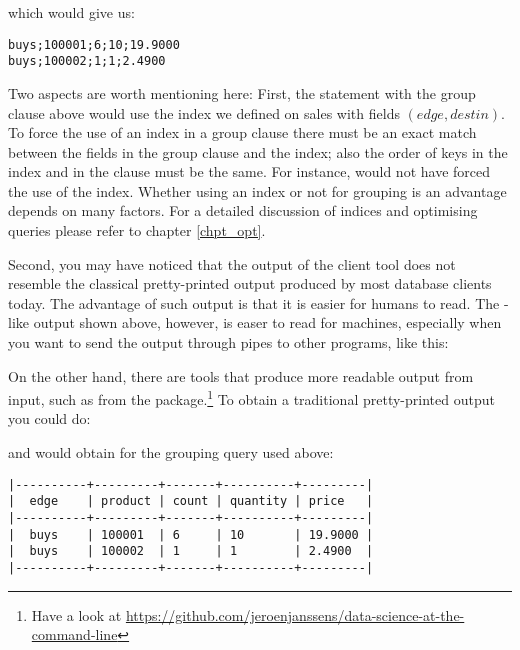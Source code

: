 which would give us:

\begin{verbatim}
buys;100001;6;10;19.9000
buys;100002;1;1;2.4900
\end{verbatim}

Two aspects are worth mentioning here:
First, the statement with the group clause above
would use the index we defined on sales
with fields $(edge, destin)$.
To force the use of an index in a group clause
there must be an exact match between the fields
in the group clause and the index; also the order
of keys in the index and in the clause must be the same.
For instance,  would
not have forced the use of the index.
Whether using an index or not for grouping
is an advantage 
depends on many factors.
For a detailed discussion of indices and
optimising queries please refer to chapter \ref{chpt_opt}.

Second, you may have noticed that the output
of the client tool does not resemble the classical
pretty-printed output produced by most database
clients today. The advantage of such output is
that it is easier for humans to read.
The -like output shown above, however,
is easer to read for machines, especially
when you want to send the output through pipes
to other programs, like this:


On the other hand, there are tools that
produce more readable output from  input,
such as  from the  package.\footnote{Have
a look at
\url{https://github.com/jeroenjanssens/data-science-at-the-command-line}}
To obtain a traditional pretty-printed output you could do:


and would obtain for the grouping query used above:

\begin{verbatim}
|----------+---------+-------+----------+---------|
|  edge    | product | count | quantity | price   |
|----------+---------+-------+----------+---------|
|  buys    | 100001  | 6     | 10       | 19.9000 |
|  buys    | 100002  | 1     | 1        | 2.4900  |
|----------+---------+-------+----------+---------|
\end{verbatim}

